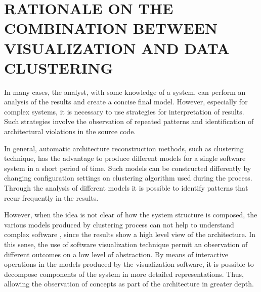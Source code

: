 \documentclass{sig-alternate-05-2015}
\begin{document}


%
%

%
%
\printccsdesc







\section{RATIONALE ON THE COMBINATION BETWEEN VISUALIZATION AND DATA CLUSTERING}\label{sec:rationale}%

In many cases, the analyst, with some knowledge of a system, can perform an analysis of the results and create a concise final model. However, especially for complex systems, it is necessary to use strategies for interpretation of results. Such strategies involve the observation of repeated patterns and identification of architectural violations in the source code.

In general, automatic architecture reconstruction methods, such as clustering technique, has the advantage to produce different models for a single software system in a short period of time. Such models can be constructed differently by changing configuration settings on clustering algorithm used during the process. Through the analysis of different models it is possible to identify patterns that recur frequently in the results.

However, when the idea is not clear of how the system structure is composed, the various models produced by clustering process can not help to understand complex software \cite{craft}, since the results show a high level view of the architecture. In this sense, the use of software visualization technique permit an observation of different outcomes on a low level of abstraction. By means of interactive operations in the models produced by the visualization software, it is possible to decompose components of the system in more detailed representations. Thus, allowing the observation of concepts as part of the architecture in greater depth.
\end{document}
